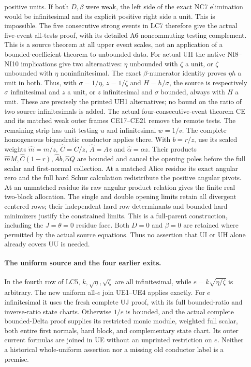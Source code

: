 positive units.  If both \(D,\beta\) were weak, the left side of
the exact NC7 elimination would be infinitesimal and its
explicit positive right side a unit.  This is impossible.
The five consecutive strong events in LC7 therefore give the
actual five-event all-tests proof, with its detailed A6
noncommuting testing complement.
This is a source theorem at all upper event scales, not an
application of a bounded-coefficient theorem to unbounded data.
For actual UH the native NI8--NI10 implications give two
alternatives: \(\eta\) unbounded with \(\zeta\) a unit, or
\(\zeta\) unbounded with \(\eta\) noninfinitesimal.
The exact \(\beta\)-numerator identity proves \(\eta h\) a
unit in both.  Thus, with \(\sigma=1/\eta\), \(z=1/\zeta\)
and \(H=h/\sigma\), the source is respectively
\(\sigma\) infinitesimal and \(z\) a unit, or \(z\)
infinitesimal and \(\sigma\) bounded, always with \(H\)
a unit.  These are precisely the printed UH1 alternatives;
no bound on the ratio of two source infinitesimals is added.
The actual four-consecutive-event theorem CE and its
matched weak outer frames CE17--CE21 remove the remote tests.
The remaining strip has unit testing \(u\) and infinitesimal
\(w=1/v\).  The complete homogeneous biquadratic conductor
 applies there.
With \(b=r/z\), use its scaled weights
\(\widehat m=m/z\), \(\widehat C=C/z\),
\(\widehat A=Az\) and \(\widehat\alpha=\alpha z\).
Their products
\(\widehat mM,\widehat C(1-r),\widehat A b,\widehat\alpha Q\)
are bounded and cancel the opening poles before the full
scalar and first-normal collection.
At a matched Alice residue its exact angular zero and
the full hard Schur calculation redistribute the positive
angular pivots.  At an unmatched residue its raw angular
product relation gives the finite real two-block allocation.
The single and double opening limits retain all divergent
centered rows; their independent hard-row determinants and
bounded hard minimizers justify the constrained limits.
This is a full-parent construction, including the
\(J=\theta=0\) residue face.
Both \(D=0\) and \(\beta=0\) are retained where permitted by the
actual source equations.  Thus no assertion that UI or UH alone
already covers UU is needed.

\paragraph{The uniform source and the four earlier exits.}
In the fourth row of LC5, \(k,\sqrt\eta,\sqrt\zeta\) are all
infinitesimal, while \(e=k\sqrt{\eta/\zeta}\) is arbitrary.
The new uniform all-\(e\) join UE1--UE4 applies exactly.
For \(e\) infinitesimal it uses the fresh complete UJ proof,
with its full bounded-ratio and inverse-ratio state charts.
Otherwise \(1/e\) is bounded, and the actual complete
bounded-Delta proof supplies its restricted monic module,
weighted full scalar, both entire first normals, hard block,
and complementary state chart.  Its outer current formulas
are joined in UE without an unprinted restriction on \(e\).
Neither a historical whole-uniform assertion nor a missing
old conductor label is a premise.

